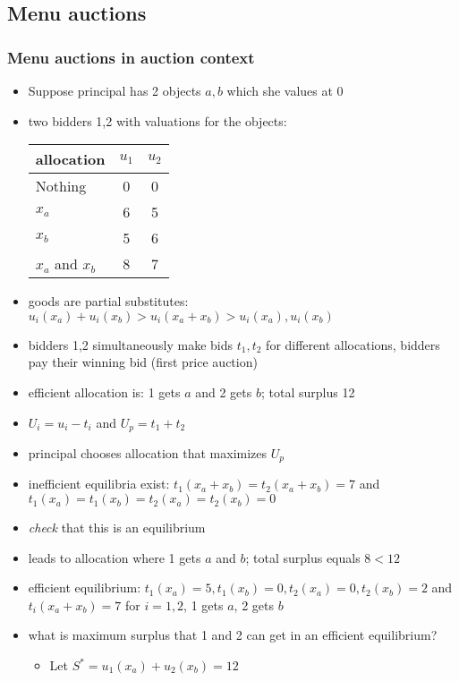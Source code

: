 \documentclass[11pt,english]{beamer}
\begin{document}
\subsection{Menu auctions}
  \label{subsec-menu_auctions}
\begin{frame}[allowframebreaks]\frametitle{Menu auctions in auction context}
  \begin{itemize}
  \item Suppose principal has 2 objects $a,b$ which she values at 0
  \item two bidders 1,2 with valuations for the objects:
  \begin{center}
    \begin{tabular}{l|cc}
      allocation    &  $u_1$ & $u_2$   \\ \hline
      Nothing        &  0  &  0   \\
      $x_a$        &  6 &  5   \\
      $x_b$        &  5  &  6   \\
      $x_a$ and $x_b$ &  8  &  7
    \end{tabular}
  \end{center}
  \item goods are partial substitutes: $u_i(x_a)+u_i(x_b)>u_i(x_a+x_b)
    > u_i(x_a),u_i(x_b)$
  \item bidders 1,2 simultaneously make bids $t_1,t_2$ for different
    allocations, bidders pay their winning bid (first price auction)
  \item efficient allocation is: 1 gets $a$ and 2 gets $b$; total
    surplus 12
  \item $U_i = u_i - t_i$ and $U_p = t_1 +t_2$
  \item principal chooses allocation that maximizes $U_p$
  \item inefficient equilibria exist: $t_1(x_a+x_b)=t_2(x_a+x_b)=7$
    and $t_1(x_a)=t_1(x_b) =t_2(x_a)=t_2(x_b) =0$
  \item \emph{check} that this is an equilibrium
  \item leads to allocation where 1 gets $a$ and $b$; total surplus
    equals $8 < 12$
  \item efficient equilibrium: $t_1(x_a)=5,t_1(x_b) =0,t_2(x_a)=0,t_2(x_b)
    =2$ and $t_i(x_a+x_b)=7$ for $i=1,2$, 1 gets $a$, 2 gets $b$
  \item what is maximum surplus that 1 and 2 can get in an efficient
    equilibrium?
    \begin{itemize}
    \item Let $S^* = u_1(x_a)+u_2(x_b) = 12$

\end{itemize}
\end{itemize}
\end{frame}
\end{document}
